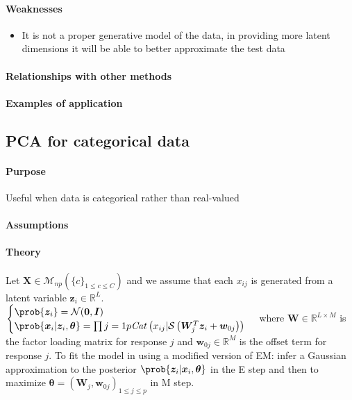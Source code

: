 \paragraph{Weaknesses}
\begin{itemize}
    \item It is not a proper generative model of the data, in providing more latent 
        dimensions it will be able to better approximate the test data
\end{itemize}
\paragraph{Relationships with other methods}
\paragraph{Examples of application}

\subsection{PCA for categorical data}
\paragraph{Purpose}
Useful when data is categorical rather than real-valued
\paragraph{Assumptions}
\paragraph{Theory}
Let $\bm{X}\in\mathcal{M}_{np}(\{c\}_{1\leq c\leq C})$ and we assume that each $x_{ij}$
is generated from a latent variable $\bm{z}_{i}\in\mathbb{R}^{L}$.
$\begin{cases}
    \prob{\bm{z}_{i}} = \mathcal{N}(\bm{0}, \bm{I}) \\
    \prob{\bm{x}_{i}|\bm{z}_{i},\bm{\theta}} = \prod{j=1}{p}\text{\emph{Cat}}\left(
        x_{ij}|\mathcal{S}\left(\bm{W}_{j}^{T}\bm{z}_{i} + \bm{w}_{0j}\right)
    \right)
\end{cases}$
where $\bm{W}\in\mathbb{R}^{L\times M}$ is the factor loading matrix for response $j$ 
and $\bm{w}_{0j}\in\mathbb{R}^{M}$ is the offset term for response $j$.
To fit the model in using a modified version of EM: infer a Gaussian approximation to 
the posterior $\prob{\bm{z}_{i}|\bm{x}_{i},\bm{\theta}}$ in the E step and then to 
maximize $\bm{\theta} = \left(\bm{W}_{j},\bm{w}_{0j}\right)_{1\leq j\leq p}$ in M step.

